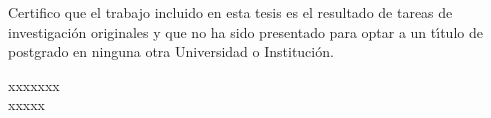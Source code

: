 


\setcounter{tocdepth}{5}

%
%

\renewcommand{\tablename}{Tabla}
\renewcommand{\listtablename}{{\'I}ndice de tablas}


\thispagestyle{empty}%
Certifico que el trabajo incluido en esta tesis es el resultado de tareas de investigaci{\'o}n originales y que no ha sido presentado para optar a un t{\'\i}tulo de postgrado en ninguna otra
Universidad o Instituci{\'o}n.\\
\vspace{0.5cm}
\begin{flushright}
\large{}\selectfont
xxxxxxx\\
\normalsize\sffamily
xxxxx
\end{flushright}

%

%

%
%
    
\tableofcontents 

\renewcommand{\baselinestretch}{1.2} %







